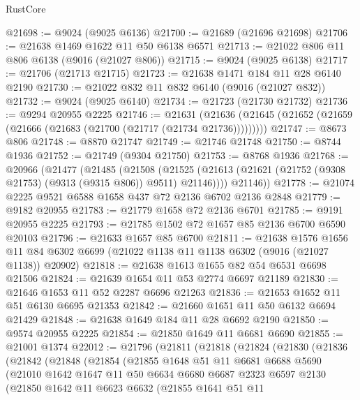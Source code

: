 \begin{lexlean}{RustCore}
\begin{coremodule}
@21698 := @9024 (@9025 @6136)
@21700 := @21689 (@21696 @21698)
@21706 := @21638 @1469 @1622 @11 @50 @6138 @6571
@21713 := @21022 @806 @11 @806 @6138 (@9016 (@21027 @806))
@21715 := @9024 (@9025 @6138)
@21717 := @21706 (@21713 @21715)
@21723 := @21638 @1471 @184 @11 @28 @6140 @2190
@21730 := @21022 @832 @11 @832 @6140 (@9016 (@21027 @832))
@21732 := @9024 (@9025 @6140)
@21734 := @21723 (@21730 @21732)
@21736 := @9294 @20955 @2225
@21746 := @21631
    (@21636 (@21645 (@21652 (@21659 (@21666 (@21683 (@21700 (@21717 (@21734 @21736)))))))))
@21747 := @8673 @806
@21748 := @8870 @21747
@21749 := @21746 @21748
@21750 := @8744 @1936
@21752 := @21749 (@9304 @21750)
@21753 := @8768 @1936
@21768 := @20966
    (@21477
      (@21485
        (@21508
          (@21525 (@21613 (@21621 (@21752 (@9308 @21753) (@9313 (@9315 @806)) @9511) @21146))))
        @21146))
@21778 := @21074 @2225 @9521 @6588 @1658 @437 @72 @2136 @6702 @2136 @2848
@21779 := @9182 @20955
@21783 := @21779 @1658 @72 @2136 @6701
@21785 := @9191 @20955 @2225
@21793 := @21785 @1502 @72 @1657 @85 @2136 @6700 @6590 @20103
@21796 := @21633 @1657 @85 @6700
@21811 := @21638
    @1576
    @1656
    @11
    @84
    @6302
    @6699
    (@21022 @1138 @11 @1138 @6302 (@9016 (@21027 @1138)) @20902)
@21818 := @21638 @1613 @1655 @82 @54 @6531 @6698 @21506
@21824 := @21639 @1654 @11 @53 @2774 @6697 @21189
@21830 := @21646 @1653 @11 @52 @2287 @6696 @21263
@21836 := @21653 @1652 @11 @51 @6130 @6695 @21353
@21842 := @21660 @1651 @11 @50 @6132 @6694 @21429
@21848 := @21638 @1649 @184 @11 @28 @6692 @2190
@21850 := @9574 @20955 @2225
@21854 := @21850 @1649 @11 @6681 @6690
@21855 := @21001 @1374
@22012 := @21796
    (@21811
      (@21818
        (@21824
          (@21830
            (@21836
              (@21842
                (@21848
                  (@21854
                    (@21855
                      @1648
                      @51
                      @11
                      @6681
                      @6688
                      @5690
                      (@21010
                        @1642
                        @1647
                        @11
                        @50
                        @6634
                        @6680
                        @6687
                        @2323
                        @6597
                        @2130
                        (@21850
                          @1642
                          @11
                          @6623
                          @6632
                          (@21855
                            @1641
                            @51
                            @11

\end{coremodule}
\end{lexlean}

